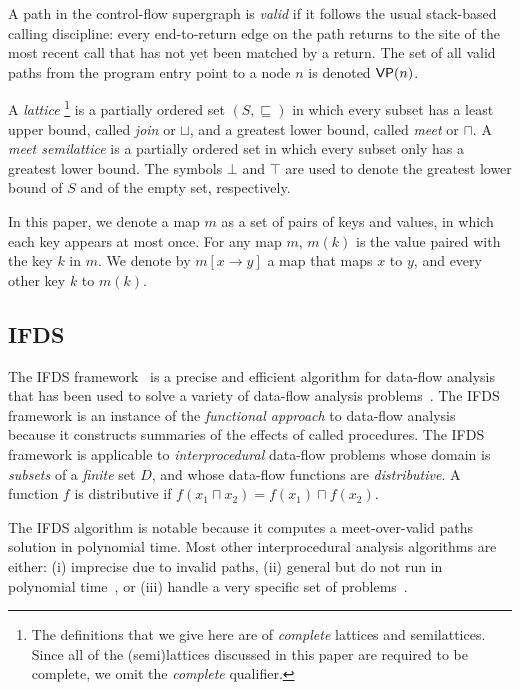 A path in the control-flow supergraph is \textit{valid} if it follows the usual stack-based calling 
discipline: every end-to-return edge on the path returns
to the site of the most recent call that has not yet been matched by a return. 
The set of all valid paths from the program entry point to
a node $n$ is denoted $\textsf{VP}(n)$.

A \textit{lattice}%
\footnote{The definitions that we give here are of \textit{complete} lattices and semilattices.
Since all of the (semi)lattices discussed in this paper are required to be complete, we omit the
\textit{complete} qualifier.}
is a partially ordered set $(S,\sqsubseteq)$ in which every subset has a least upper bound, called \textit{join} or $\sqcup$, and a greatest lower bound, called \textit{meet} or $\sqcap$.
A \textit{meet semilattice} is a partially ordered set in which every subset only has a greatest lower bound.
The symbols $\bot$ and $\top$ are used to denote the greatest lower bound of $S$ and of the empty set, respectively.

In this paper, we denote a map $m$ as a set of pairs of keys and values, in which each key appears at most once.
For any map $m$,  $m(k)$ is the value paired with the key $k$ in $m$. We denote by $m[x\to y]$ a map that maps $x$ to $y$, and every other key $k$ to $m(k)$.

\subsection{IFDS}\label{sec:bgifds}
The IFDS framework~\cite{reps1995precise} is a precise and efficient algorithm for data-flow analysis
that has been used to solve a variety of data-flow analysis problems~\cite{bodden2013spl,naeem2008typestate,DBLP:conf/birthday/KreikerRRSWY13,tripp2009taj}.
The IFDS framework is an instance of the \textit{functional approach} to data-flow analysis~\cite{pnueli1981two}
because it constructs summaries of the effects of called procedures.
The IFDS framework is applicable to \textit{interprocedural} data-flow problems whose domain is \textit{subsets} of a \textit{finite} set $D$,
and whose data-flow functions are \textit{distributive}.
A function $f$ is distributive if 
$f(x_1\sqcap x_2)=f(x_1)\sqcap f(x_2)$.

The IFDS algorithm is notable because it computes a meet-over-valid paths solution in polynomial time.
Most other interprocedural analysis algorithms are either: 
  (i) imprecise due to invalid paths,
  (ii) general but do not run in polynomial time~\cite{knoop1992interprocedural,pnueli1981two}, or 
  (iii) handle a very specific set of problems~\cite{knoop1993efficient}.

